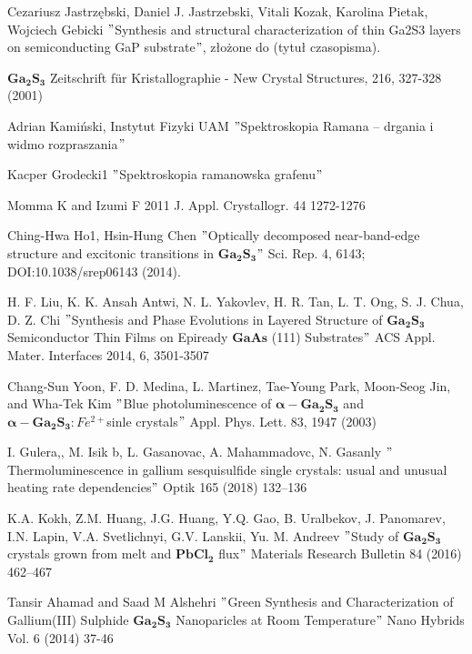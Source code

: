 \newpage
 
\begin{thebibliography}{}
	 Cezariusz Jastrzębski, Daniel J. Jastrzebski, Vitali Kozak, Karolina Pietak, Wojciech Gebicki $"$Synthesis and structural characterization of thin Ga2S3 layers on semiconducting GaP substrate$"$, złożone do (tytuł czasopisma).
	
	 $\mathbf{Ga_{2}S_{3}}$ Zeitschrift für Kristallographie - New Crystal Structures, 216, 327-328 (2001)
	
	 Adrian Kamiński, Instytut Fizyki UAM $"$Spektroskopia Ramana – drgania i widmo rozpraszania$"$
	
	 Kacper Grodecki1 $"$Spektroskopia ramanowska grafenu$"$
	
	 Momma K and Izumi F 2011 J. Appl. Crystallogr. 44 1272-1276
	
	 Ching-Hwa Ho1, Hsin-Hung Chen $"$Optically decomposed near-band-edge structure and excitonic transitions in
	$\mathbf{Ga_{2}S_{3}}$$"$ Sci. Rep. 4, 6143; DOI:10.1038/srep06143
	(2014).
	
	 H. F. Liu, K. K. Ansah Antwi, N. L. Yakovlev, H. R. Tan, L. T. Ong, S. J. Chua, D. Z. Chi $"$Synthesis and Phase Evolutions in Layered Structure of $\mathbf{Ga_{2}S_{3}}$ Semiconductor Thin Films on Epiready $\mathbf{GaAs}$ (111) Substrates$"$ ACS Appl. Mater. Interfaces 2014, 6, 3501-3507
	
	 Chang-Sun Yoon, F. D. Medina, L. Martinez, Tae-Young Park, Moon-Seog Jin, and Wha-Tek Kim $"$Blue photoluminescence of $\mathbf{\alpha-Ga_{2}S_{3}}$ and $\mathbf{\alpha-Ga_{2}S_{3}}:Fe^{2+} $sinle crystals$"$ Appl. Phys. Lett. 83, 1947 (2003)
	
	 I. Gulera,, M. Isik b, L. Gasanovac, A. Mahammadovc, N. Gasanly $"$Thermoluminescence in gallium sesquisulfide single crystals:
	usual and unusual heating rate dependencies$"$ Optik 165 (2018) 132–136
	
	 K.A. Kokh, Z.M. Huang, J.G. Huang, Y.Q. Gao, B. Uralbekov, J. Panomarev, I.N. Lapin, V.A. Svetlichnyi, G.V. Lanskii, Yu. M. Andreev $"$Study of $\mathbf{Ga_{2}S_{3}}$ crystals grown from melt and $\mathbf{PbCl_{2}}$ flux$"$ Materials Research Bulletin 84 (2016) 462–467
	
	 Tansir Ahamad and Saad M Alshehri $"$Green Synthesis and Characterization of Gallium(III) Sulphide $\mathbf{Ga_{2}S_{3}}$
	Nanoparicles at Room Temperature$"$ Nano Hybrids Vol. 6 (2014) 37-46
	

\end{thebibliography}
